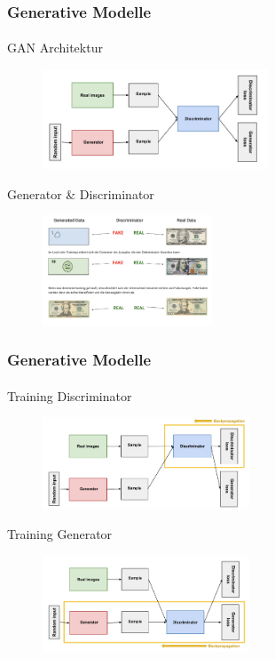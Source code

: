 \documentclass{beamer}
\begin{document}
\begin{frame}
    \frametitle{Generative Modelle}
\framesubtitle{}
    \begin{block}{GAN Architektur}
\begin{figure}[H]
    \centering
    \includegraphics[width=0.6\textwidth]{images/gan_diagram}
\end{figure}
\end{block}
\begin{block}{Generator \& Discriminator}
    \begin{figure}[H]
        \centering
        \includegraphics[width=0.45\textwidth]{images/gan_images}
    \end{figure}
    \end{block}
\end{frame}


\begin{frame}
    \frametitle{Generative Modelle}
\framesubtitle{}
    \begin{block}{Training Discriminator}
\begin{figure}[H]
    \centering
    \includegraphics[width=0.55\textwidth]{images/gan_diagram_discriminator}
\end{figure}
\end{block}
\begin{block}{Training Generator}
    \begin{figure}[H]
        \centering
        \includegraphics[width=0.55\textwidth]{images/gan_diagram_generator}
    \end{figure}
    \end{block}
\end{frame}
\end{document}
